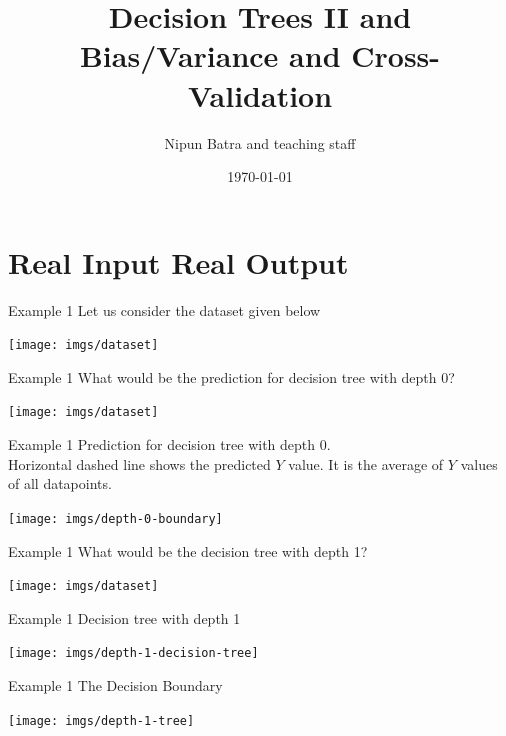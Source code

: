 \documentclass{beamer}
\title{Decision Trees II and Bias/Variance and Cross-Validation}
\date{\today}
\author{Nipun Batra and teaching staff}
\institute{IIT Gandhinagar}
\begin{document}
	\maketitle
	
	




\section{Real Input Real Output}

\begin{frame}{Example 1}
Let us consider the dataset given below
\begin{center}
\texttt{[image: imgs/dataset]}
\end{center}
\end{frame}

\begin{frame}{Example 1}
What would be the prediction for decision tree with depth 0?
\begin{center}
\texttt{[image: imgs/dataset]}
\end{center}
\end{frame}

\begin{frame}{Example 1}
Prediction for decision tree with depth 0.\\
Horizontal dashed line shows the predicted $Y$ value. It is the average of $Y$ values of all datapoints.\\
\begin{center}
\texttt{[image: imgs/depth-0-boundary]}	
\end{center}
\end{frame}


\begin{frame}{Example 1}
What would be the decision tree with depth 1?
\begin{center}
\texttt{[image: imgs/dataset]}
\end{center}
\end{frame}

\begin{frame}{Example 1}
Decision tree with depth 1
\begin{center}
\texttt{[image: imgs/depth-1-decision-tree]}	
\end{center}
\end{frame}

\begin{frame}{Example 1}
The Decision Boundary
\begin{center}
\texttt{[image: imgs/depth-1-tree]}
\end{center}
\end{frame}
\end{document}
